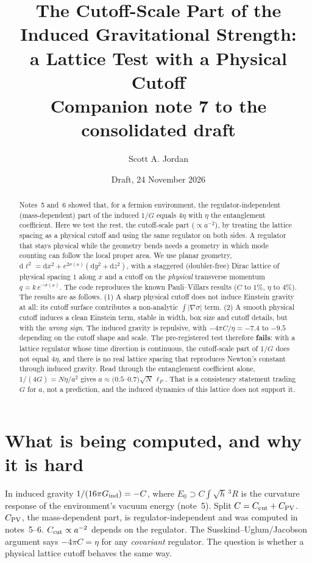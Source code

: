 \documentclass[11pt]{article}
\title{The Cutoff-Scale Part of the Induced Gravitational Strength:\\ a Lattice Test with a Physical Cutoff\\[4pt]
\large Companion note 7 to the consolidated draft}
\author{Scott A. Jordan}
\date{Draft, 24 November 2026}
\newcommand{\dd}{\mathrm{d}}
\begin{document}
\sloppy
\maketitle
\begin{abstract}
Notes~5 and~6 showed that, for a fermion environment, the regulator-independent (mass-dependent) part of the induced $1/G$ equals $4\eta$ with $\eta$ the entanglement coefficient. Here we test the rest, the cutoff-scale part ($\propto a^{-2}$), by treating the lattice spacing as a physical cutoff and using the same regulator on both sides. A regulator that stays physical while the geometry bends needs a geometry in which mode counting can follow the local proper area. We use planar geometry, $\dd\ell^2=\dd x^2+e^{2\sigma(x)}(\dd y^2+\dd z^2)$, with a staggered (doubler-free) Dirac lattice of physical spacing $1$ along $x$ and a cutoff on the \emph{physical} transverse momentum $q=k\,e^{-\sigma(x)}$. The code reproduces the known Pauli--Villars results ($C$ to $1\%$, $\eta$ to $4\%$). The results are as follows.
(1) A sharp physical cutoff does not induce Einstein gravity at all: its cutoff surface contributes a non-analytic $\int|\nabla\sigma|$ term.
(2) A smooth physical cutoff induces a clean Einstein term, stable in width, box size and cutoff details, but with the \emph{wrong sign}. The induced gravity is repulsive, with $-4\pi C/\eta=-7.4$ to $-9.5$ depending on the cutoff shape and scale.
The pre-registered test therefore \textbf{fails}: with a lattice regulator whose time direction is continuous, the cutoff-scale part of $1/G$ does not equal $4\eta$, and there is no real lattice spacing that reproduces Newton's constant through induced gravity. Read through the entanglement coefficient alone, $1/(4G)=N\eta/a^2$ gives $a\approx(0.5$--$0.7)\sqrt N\,\ell_P$. That is a consistency statement trading $G$ for $a$, not a prediction, and the induced dynamics of this lattice does not support it.
\end{abstract}

\section{What is being computed, and why it is hard}
In induced gravity $1/(16\pi G_{\rm ind})=-C$, where $E_0\supset C\int\sqrt h\,{}^3\!R$ is the curvature response of the environment's vacuum energy (note~5). Split $C=C_{\rm cut}+C_{\rm PV}$. $C_{\rm PV}$, the mass-dependent part, is regulator-independent and was computed in notes~5--6. $C_{\rm cut}\propto a^{-2}$ depends on the regulator. The Susskind--Uglum/Jacobson argument says $-4\pi C=\eta$ for any \emph{covariant} regulator. The question is whether a physical lattice cutoff behaves the same way.
\end{document}
